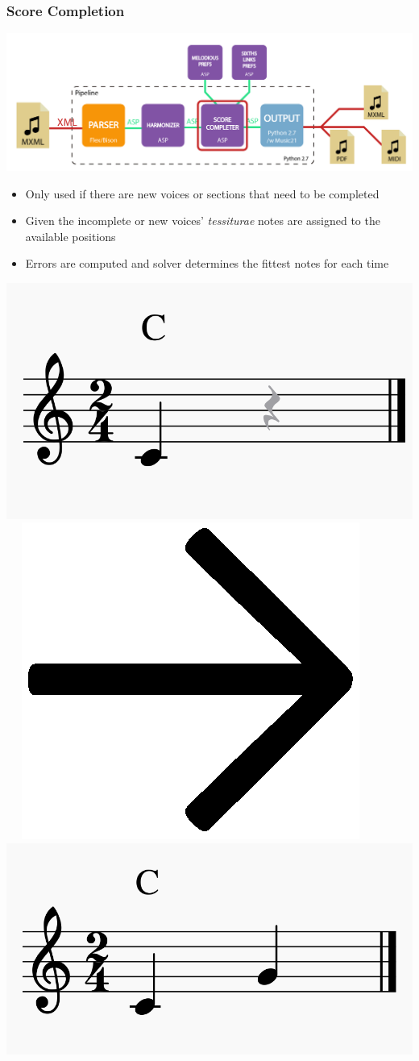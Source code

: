 \documentclass[english]{beamer}
\begin{document}
	\begin{frame}[t,fragile]
	\frametitle{Score Completion}
	\begin{center}
			\includegraphics[width=0.6\linewidth]{imagenes/arch_trans/arquitectura_final_asp_comp-01.png}
			\end{center}
	\begin{itemize}
		\item Only used if there are \alert{new voices or sections} that need to be completed
		\pause
		\item Given the incomplete or new voices' \textit{tessiturae} \alert{notes are assigned} to the available positions
		\pause
		\item \alert{Errors} are computed and solver determines the \alert{fittest notes} for each time
	\end{itemize}
		\begin{center}
				\includegraphics[width=0.25\linewidth,valign=c]{imagenes/incomplete_score.png}~~
				\includegraphics[width=0.04\linewidth,valign=c]{imagenes/arrow.png}~~
				\includegraphics[width=0.25\linewidth,valign=c]{imagenes/completed_score.png}
		\end{center}
	\end{frame}
\end{document}
